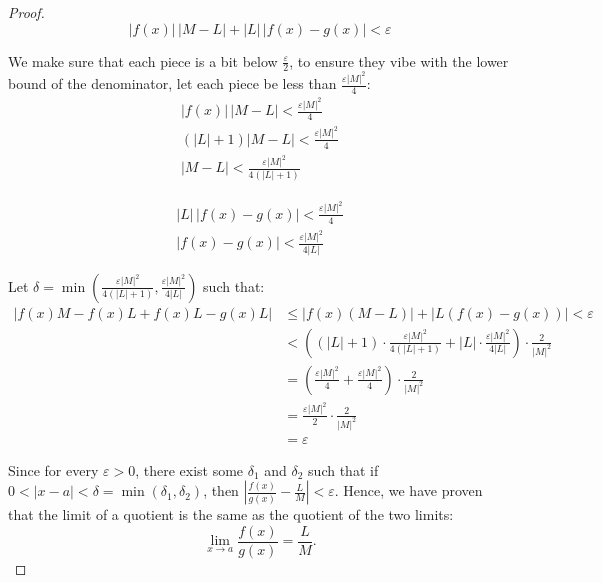 \documentclass{article}
\begin{document}
\begin{proof}
\[
|f(x)|\,|M - L| + |L|\,|f(x) - g(x)| < \varepsilon
\]


We make sure that each piece is a bit below $\frac{\varepsilon}{2}$, to ensure they vibe with the lower bound of the denominator, let each piece be less than $\frac{\varepsilon |M|^2}{4}$:
\begin{align}
|f(x)|\,|M - L| < \frac{\varepsilon |M|^2}{4} \\
(|L| + 1) |M - L| < \frac{\varepsilon |M|^2}{4} \\
|M - L| < \frac{\varepsilon |M|^2}{4(|L| + 1)}
\end{align}

\begin{align}
|L|\,|f(x) - g(x)| < \frac{\varepsilon |M|^2}{4} \\
|f(x) - g(x)| < \frac{\varepsilon |M|^2}{4 |L|}
\end{align}


Let $\delta = \min\left(\frac{\varepsilon |M|^2}{4(|L| + 1)}, \frac{\varepsilon |M|^2}{4|L|}\right)$ such that:
\[
\begin{aligned}
|f(x)M - f(x)L + f(x)L - g(x)L| &\leq |f(x)(M - L)| + |L(f(x) - g(x))| < \varepsilon \\
&< \left( (|L| + 1) \cdot \frac{\varepsilon |M|^2}{4(|L| + 1)} + |L| \cdot \frac{\varepsilon |M|^2}{4|L|} \right) \cdot \frac{2}{|M|^2} \\
&= \left( \frac{\varepsilon |M|^2}{4} + \frac{\varepsilon |M|^2}{4} \right) \cdot \frac{2}{|M|^2} \\
&= \frac{\varepsilon |M|^2}{2} \cdot \frac{2}{|M|^2} \\
&= \varepsilon
\end{aligned}
\]



Since for every $\varepsilon > 0$, there exist some $\delta_1$ and $\delta_2$ such that if $0 < |x - a| < \delta = \min(\delta_1, \delta_2)$, then $\left| \frac{f(x)}{g(x)} - \frac{L}{M} \right| < \varepsilon$. Hence, we have proven that the limit of a quotient is the same as the quotient of the two limits:
\[
\lim_{x \to a} \frac{f(x)}{g(x)} = \frac{L}{M}.
\]









\end{proof}
\end{document}
